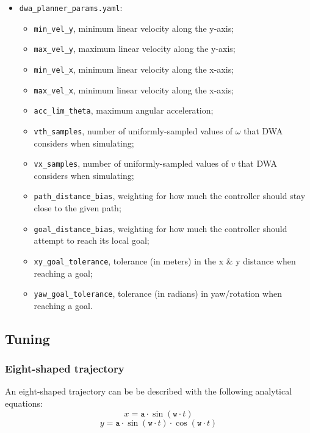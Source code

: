 \documentclass[11pt,a4paper]{article}
\begin{document}
\begin{itemize}
    \item \texttt{dwa\_planner\_params.yaml}:
        \begin{itemize}
            \item \texttt{min\_vel\_y}, minimum linear velocity along the y-axis;
            \item \texttt{max\_vel\_y}, maximum linear velocity along the y-axis;
            \item \texttt{min\_vel\_x}, minimum linear velocity along the x-axis;
            \item \texttt{max\_vel\_x}, minimum linear velocity along the x-axis;
            \item \texttt{acc\_lim\_theta}, maximum angular acceleration;
            \item \texttt{vth\_samples}, number of uniformly-sampled values of $\omega$ that DWA considers when simulating;
            \item \texttt{vx\_samples}, number of uniformly-sampled values of $v$ that DWA considers when simulating;
            \item \texttt{path\_distance\_bias}, weighting for how much the controller should stay close to the given path;
            \item \texttt{goal\_distance\_bias}, weighting for how much the controller should attempt to reach its local goal;
            \item \texttt{xy\_goal\_tolerance}, tolerance (in meters) in the x \& y distance when reaching a goal;
            \item \texttt{yaw\_goal\_tolerance}, tolerance (in radians) in yaw/rotation when reaching a goal.\\
        \end{itemize}

\end{itemize}


\subsection{Tuning}

\subsubsection{Eight-shaped trajectory}

An eight-shaped trajectory can be be described with the following analytical equations:
$$x = \texttt{a} \cdot \sin (\texttt{w} \cdot t)$$
$$y = \texttt{a} \cdot \sin (\texttt{w} \cdot t)\cdot \cos (\texttt{w} \cdot t)$$\\
\end{document}
